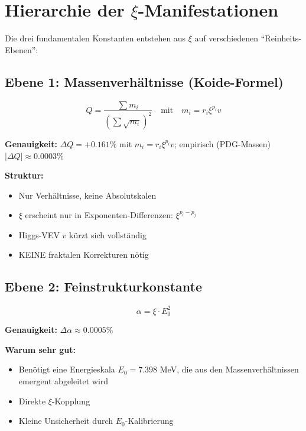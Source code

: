 	
	\section{Hierarchie der $\xi$-Manifestationen}
	
	Die drei fundamentalen Konstanten entstehen aus $\xi$ auf verschiedenen ``Reinheits-Ebenen'':
	
	\subsection{Ebene 1: Massenverhältnisse (Koide-Formel)}
	
	\begin{equation}
		Q = \frac{\sum m_i}{\left(\sum \sqrt{m_i}\right)^2} \quad \text{mit} \quad m_i = r_i \xi^{p_i} v
	\end{equation}
	
	\begin{tcolorbox}[colback=green!5!white,colframe=green!75!black,title=Reinste $\xi$-Form]
		\textbf{Genauigkeit:} $\Delta Q = +0.161\%$ mit $m_i = r_i \xi^{p_i} v$; empirisch (PDG-Massen) $|\Delta Q| \approx 0.0003\%$
		
		\textbf{Struktur:}
		\begin{itemize}
			\item Nur Verhältnisse, keine Absolutskalen
			\item $\xi$ erscheint nur in Exponenten-Differenzen: $\xi^{p_i - p_j}$
			\item Higgs-VEV $v$ kürzt sich vollständig
			\item KEINE fraktalen Korrekturen nötig
		\end{itemize}
	\end{tcolorbox}
	
	\subsection{Ebene 2: Feinstrukturkonstante}
	
	\begin{equation}
		\alpha = \xi \cdot E_0^2
	\end{equation}
	
	\begin{tcolorbox}[colback=blue!5!white,colframe=blue!75!black,title=Semi-reine $\xi$-Form]
		\textbf{Genauigkeit:} $\Delta \alpha \approx 0.0005\%$
		
		\textbf{Warum sehr gut:}
		\begin{itemize}
			\item Benötigt eine Energieskala $E_0 = 7.398$ MeV, die aus den Massenverhältnissen emergent abgeleitet wird
			\item Direkte $\xi$-Kopplung
			\item Kleine Unsicherheit durch $E_0$-Kalibrierung
		\end{itemize}
	\end{tcolorbox}
	
